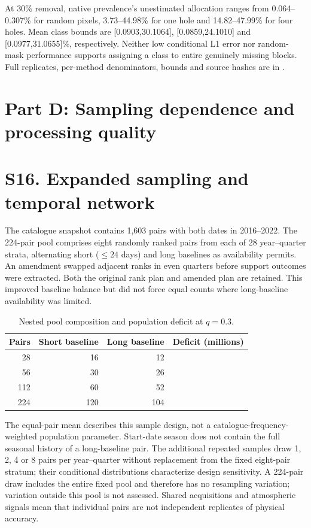 \documentclass[10pt,a4paper]{article}
\begin{document}
At 30\% removal, native prevalence's unestimated allocation ranges from 0.064--0.307\% for random pixels, 3.73--44.98\% for one hole and 14.82--47.99\% for four holes. Mean class bounds are [0.0903,30.1064], [0.0859,24.1010] and [0.0977,31.0655]\%, respectively. Neither low conditional L1 error nor random-mask performance supports assigning a class to entire genuinely missing blocks. Full replicates, per-method denominators, bounds and source hashes are in .




\section*{Part D: Sampling dependence and processing quality}
\section*{S16. Expanded sampling and temporal network}
The catalogue snapshot contains 1,603 pairs with both dates in 2016--2022. The 224-pair pool comprises eight randomly ranked pairs from each of 28 year--quarter strata, alternating short ($\leq24$ days) and long baselines as availability permits. An amendment swapped adjacent ranks in even quarters before support outcomes were extracted. Both the original rank plan and amended plan are retained. This improved baseline balance but did not force equal counts where long-baseline availability was limited.

\begin{table}[htbp]\centering
\caption{Nested pool composition and population deficit at $q=0.3$.}
\begin{tabular}{rrrr}\toprule
Pairs & Short baseline & Long baseline & Deficit (millions)\\\midrule
28 & 16 & 12 & \SampleTwentyEight{}\\
56 & 30 & 26 & \SampleFiftySix{}\\
112 & 60 & 52 & \SampleOneTwelve{}\\
224 & 120 & 104 & \SampleTwoTwentyFour{}\\\bottomrule
\end{tabular}
\end{table}

The equal-pair mean describes this sample design, not a catalogue-frequency-weighted population parameter. Start-date season does not contain the full seasonal history of a long-baseline pair. The additional repeated samples draw 1, 2, 4 or 8 pairs per year--quarter without replacement from the fixed eight-pair stratum; their conditional distributions characterize design sensitivity. A 224-pair draw includes the entire fixed pool and therefore has no resampling variation; variation outside this pool is not assessed. Shared acquisitions and atmospheric signals mean that individual pairs are not independent replicates of physical accuracy.
\end{document}

